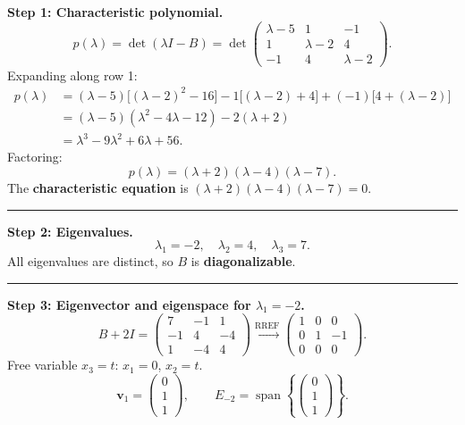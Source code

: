 \documentclass[12pt,a3paper]{article}
\begin{document}
\begin{tcolorbox}[enhanced,breakable,
  colback=cE!4,colframe=cE,boxrule=0.8pt,arc=5pt,
  title={\textbf{Answer --- Char.\ Poly., Eigenvalues, Eigenvectors \& Eigenspaces of
    $B=\begin{pmatrix}5&-1&1\\-1&2&-4\\1&-4&2\end{pmatrix}$}},
  fonttitle=\bfseries\color{white},colbacktitle=cE]

\textbf{Step 1: Characteristic polynomial.}
\[
  p(\lambda) = \det(\lambda I - B)
  = \det\begin{pmatrix}\lambda-5&1&-1\\1&\lambda-2&4\\-1&4&\lambda-2\end{pmatrix}.
\]
Expanding along row 1:
\begin{align*}
  p(\lambda) &= (\lambda-5)\bigl[(\lambda-2)^2-16\bigr]
               - 1\bigl[(\lambda-2)+4\bigr]
               + (-1)\bigl[4+(\lambda-2)\bigr] \\
             &= (\lambda-5)(\lambda^2-4\lambda-12) - 2(\lambda+2) \\
             &= \lambda^3 - 9\lambda^2 + 6\lambda + 56.
\end{align*}
Factoring:
\[
  \boxed{p(\lambda) = (\lambda+2)(\lambda-4)(\lambda-7).}
\]
The \textbf{characteristic equation} is $(\lambda+2)(\lambda-4)(\lambda-7)=0$.

\medskip\textcolor{cE}{\rule{\textwidth}{0.4pt}}

\textbf{Step 2: Eigenvalues.}
\[
  \lambda_1 = -2, \quad \lambda_2 = 4, \quad \lambda_3 = 7.
\]
All eigenvalues are distinct, so $B$ is \textbf{diagonalizable}.

\medskip\textcolor{cE}{\rule{\textwidth}{0.4pt}}

\textbf{Step 3: Eigenvector and eigenspace for $\lambda_1=-2$.}
\[
  B+2I = \begin{pmatrix}7&-1&1\\-1&4&-4\\1&-4&4\end{pmatrix}
  \xrightarrow{\text{RREF}}
  \begin{pmatrix}1&0&0\\0&1&-1\\0&0&0\end{pmatrix}.
\]
Free variable $x_3=t$: $x_1=0$, $x_2=t$.
\[
  \mathbf{v}_1=\begin{pmatrix}0\\1\\1\end{pmatrix}, \qquad
  E_{-2}=\operatorname{span}\!\left\{\begin{pmatrix}0\\1\\1\end{pmatrix}\right\}.
\]


\end{tcolorbox}
\end{document}
